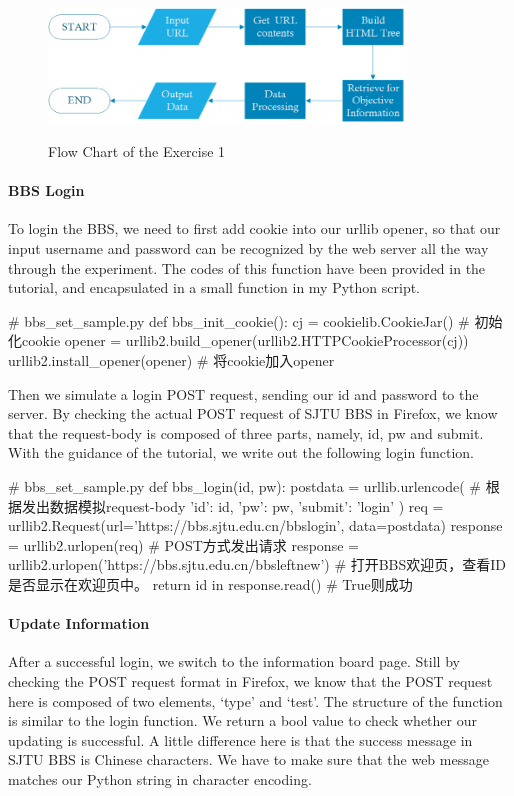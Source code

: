 \documentclass{article}
\begin{document}
\begin{figure}[htbp]
\centering
\includegraphics[width=9.5cm]{img/flowchart.png}
\label{fig:flowchart}
\caption{Flow Chart of the Exercise 1}
\end{figure}

\paragraph{BBS Login} To login the BBS, we need to first add cookie into our urllib opener, so that our input username and password can be recognized by the web server all the way through the experiment. The codes of this function have been provided in the tutorial, and encapsulated in a small function in my Python script.
\begin{python}
# bbs_set_sample.py
def bbs_init_cookie():
    cj = cookielib.CookieJar()      # 初始化cookie
    opener = urllib2.build_opener(urllib2.HTTPCookieProcessor(cj))
    urllib2.install_opener(opener)  # 将cookie加入opener
\end{python} 

Then we simulate a login POST request, sending our id and password to the server. By checking the actual POST request of SJTU BBS in Firefox, we know that the request-body is composed of three parts, namely, id, pw and submit. With the guidance of the tutorial, we write out the following login function.

\begin{python}
# bbs_set_sample.py
def bbs_login(id, pw):
    postdata = urllib.urlencode({    # 根据发出数据模拟request-body
        'id': id,
        'pw': pw,
        'submit': 'login'
    })
    req = urllib2.Request(url='https://bbs.sjtu.edu.cn/bbslogin', data=postdata)
    response = urllib2.urlopen(req)  # POST方式发出请求
    response = urllib2.urlopen('https://bbs.sjtu.edu.cn/bbsleftnew')  
                                  # 打开BBS欢迎页，查看ID是否显示在欢迎页中。
    return id in response.read()     # True则成功
\end{python}


\paragraph{Update Information}
After a successful login, we switch to the information board page. Still by checking the POST request format in Firefox, we know that the POST request here is composed of two elements, `type' and `test'. The structure of the function is similar to the login function. We return a bool value to check whether our updating is successful. A little difference here is that the success message in SJTU BBS is Chinese characters. We have to make sure that the web message matches our Python string in character encoding.
\end{document}
